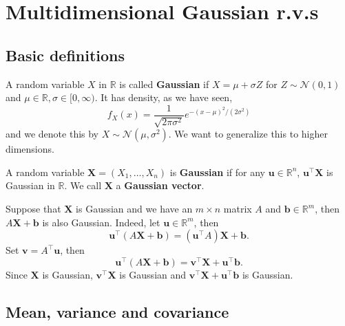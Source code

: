 \section{Multidimensional Gaussian r.v.s}
\subsection{Basic definitions}
\begin{definition}
    A random variable $X$ in $\mathbb R$ is called \textbf{Gaussian} if $X=\mu+\sigma Z$ for $Z\sim\mathcal N(0,1)$ and $ \mu\in \mathbb{R}, \sigma\in [0,\infty) $.
    It has density, as we have seen,
    $$f_X(x)=\frac{1}{\sqrt{2\pi\sigma^2}}e^{-(x-\mu)^2/(2\sigma^2)}$$
    and we denote this by $X\sim\mathcal N(\mu,\sigma^2)$.
    We want to generalize this to higher dimensions.
\end{definition}
\begin{definition}
    A random variable $\mathbf{X}=(X_1,\ldots,X_n)$ is \textbf{Gaussian} if for any $\mathbf{u}\in\mathbb R^n$, $\mathbf{u}^\top \mathbf{X}$ is Gaussian in $\mathbb R$.
    We call $\mathbf{X}$ a \textbf{Gaussian vector}.
\end{definition}

\begin{example}
    Suppose that $ \mathbf{X} $ is Gaussian and we have an $m\times n$ matrix $A$ and $\mathbf{b}\in\mathbb R^m$, then $A\mathbf{X}+\mathbf{b}$ is also Gaussian. Indeed, let $ \mathbf{u}\in \mathbb{R}^{m} $, then 
    \[
        \mathbf{u}^\top (A\mathbf{X}+\mathbf{b}) = (\mathbf{u}^\top A)\mathbf{X}+\mathbf{b}.
    \]
    Set $ \mathbf{v} = A^\top \mathbf{u} $, then 
    \[
        \mathbf{u}^\top (A\mathbf{X}+\mathbf{b}) = \mathbf{v}^\top \mathbf{X} + \mathbf{u}^\top \mathbf{b}.
    \]
    Since $\mathbf{X}$ is Gaussian, $ \mathbf{v}^\top \mathbf{X} $ is Gaussian and $ \mathbf{v}^\top \mathbf{X} + \mathbf{u}^\top \mathbf{b} $ is Gaussian.
\end{example}
\subsection{Mean, variance and covariance}

